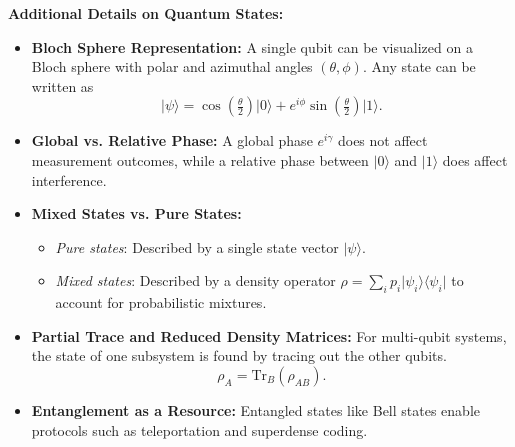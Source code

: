 \documentclass{article}
\begin{document}
\textbf{Additional Details on Quantum States:}
\begin{itemize}
    \item \textbf{Bloch Sphere Representation:} A single qubit can be visualized on a Bloch sphere with polar and azimuthal angles \((\theta, \phi)\). Any state can be written as
    \[
    \lvert \psi \rangle = \cos\left(\tfrac{\theta}{2}\right)\lvert 0 \rangle + e^{i\phi}\sin\left(\tfrac{\theta}{2}\right)\lvert 1 \rangle.
    \]
    \item \textbf{Global vs. Relative Phase:} A global phase \(e^{i\gamma}\) does not affect measurement outcomes, while a relative phase between \(\lvert 0 \rangle\) and \(\lvert 1 \rangle\) does affect interference.
    \item \textbf{Mixed States vs. Pure States:} 
        \begin{itemize}
            \item \emph{Pure states}: Described by a single state vector \(\lvert \psi \rangle\).
            \item \emph{Mixed states}: Described by a density operator \(\rho = \sum_i p_i \lvert \psi_i \rangle \langle \psi_i \rvert\) to account for probabilistic mixtures.
        \end{itemize}
    \item \textbf{Partial Trace and Reduced Density Matrices:} For multi-qubit systems, the state of one subsystem is found by tracing out the other qubits.
    \[
    \rho_A = \mathrm{Tr}_B(\rho_{AB}).
    \]
    \item \textbf{Entanglement as a Resource:} Entangled states like Bell states enable protocols such as teleportation and superdense coding.
\end{itemize}

\newpage
\end{document}
